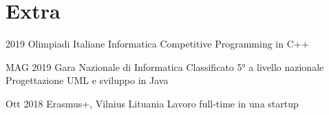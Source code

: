 \documentclass{tccv}
\begin{document}
\section{Extra}

\begin{yearlist}

\item[]{2019}
     {Olimpiadi Italiane Informatica}
     {Competitive Programming in C++}

\item[]{MAG 2019}
     {Gara Nazionale di Informatica}
     {Classificato 5° a livello nazionale \newline
     Progettazione UML e sviluppo in Java}

\item[]{Ott 2018}
     {Erasmus+, Vilnius Lituania}
     {Lavoro full-time in una startup}

\end{yearlist}
\end{document}
